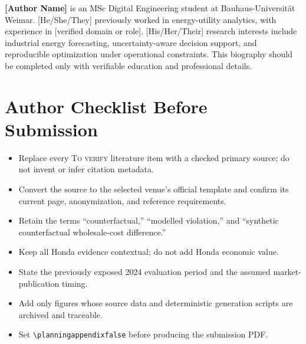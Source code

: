 \documentclass[10pt,twocolumn]{article}
\newif\ifplanningappendix
\newcommand{\tverify}{\textsc{To verify}}
\begin{document}
\textbf{[Author Name]} is an MSc Digital Engineering student at
Bauhaus-Universit\"at Weimar. [He/She/They] previously worked in energy-utility
analytics, with experience in [verified domain or role]. [His/Her/Their]
research interests include industrial energy forecasting, uncertainty-aware
decision support, and reproducible optimization under operational constraints.
This biography should be completed only with verifiable education and
professional details.

\section{Author Checklist Before Submission}

\begin{itemize}
  \item Replace every \tverify{} literature item with a checked primary source;
  do not invent or infer citation metadata.
  \item Convert the source to the selected venue's official template and confirm
  its current page, anonymization, and reference requirements.
  \item Retain the terms ``counterfactual,'' ``modelled violation,'' and
  ``synthetic counterfactual wholesale-cost difference.''
  \item Keep all Honda evidence contextual; do not add Honda economic value.
  \item State the previously exposed 2024 evaluation period and the assumed
  market-publication timing.
  \item Add only figures whose source data and deterministic generation scripts
  are archived and traceable.
  \item Set \verb|\planningappendixfalse| before producing the submission PDF.
\end{itemize}
\fi

\end{document}
